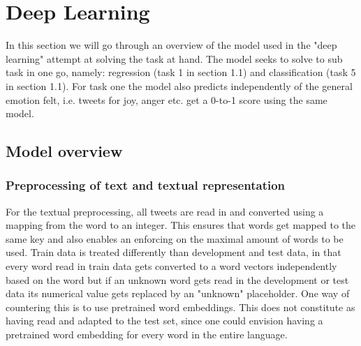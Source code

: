 
\section{Deep Learning}
In this section we will go through an overview of the model used in the "deep learning" attempt at solving the task at hand. The model seeks to solve to sub task in one go, namely: regression (task 1 in section 1.1) and classification (task 5 in section 1.1). For task one the model also predicts independently of the general emotion felt, i.e. tweets for joy, anger etc. get a 0-to-1 score using the same model.

\subsection{Model overview}

\subsubsection{Preprocessing of text and textual representation}
For the textual preprocessing, all tweets are read in and converted using a mapping from the word to an integer. This ensures that words get mapped to the same key and also enables an enforcing on the maximal amount of words to be used. Train data is treated differently than development and test data, in that every word read in train data gets converted to a word vectors independently based on the word but if an unknown word gets read in the development or test data its numerical value gets replaced by an "unknown" placeholder. One way of countering this is to use pretrained word embeddings. This does not constitute as having read and adapted to the test set, since one could envision having a pretrained word embedding for every word in the entire language.
